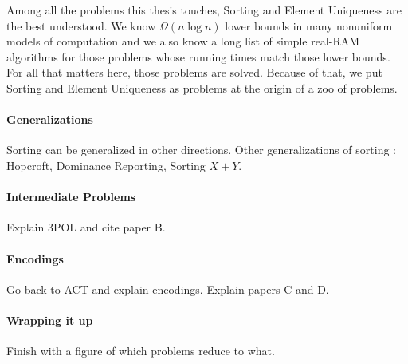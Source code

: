 Among all the problems this thesis touches, Sorting and Element Uniqueness
are the best understood. We know \(\Omega(n \log n)\) lower bounds in many
nonuniform models of computation and we also know a long list of simple
real-RAM algorithms for those problems whose running times match those lower
bounds. For all that matters here, those problems are solved.
%
Because of that, we put Sorting and Element Uniqueness as problems at the
origin of a zoo of problems.

\paragraph{Generalizations}
Sorting can be generalized in other directions.
Other generalizations of sorting : Hopcroft, Dominance Reporting, Sorting \(X+Y\).

\paragraph{Intermediate Problems} Explain 3POL and cite paper B.

\paragraph{Encodings}
Go back to ACT and explain encodings. Explain papers C and D.

\paragraph{Wrapping it up}

Finish with a figure of which problems reduce to what.
